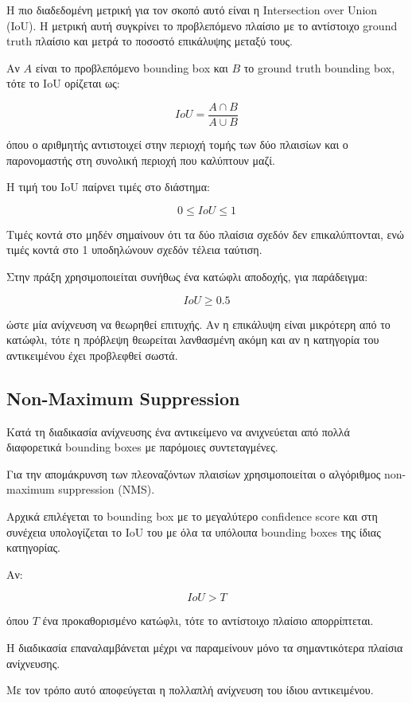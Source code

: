 \documentclass[12pt]{article}
\begin{document}
Η πιο διαδεδομένη μετρική για τον σκοπό αυτό είναι η Intersection over Union (IoU). Η μετρική αυτή συγκρίνει το προβλεπόμενο πλαίσιο με το αντίστοιχο 
ground truth πλαίσιο και μετρά το ποσοστό επικάλυψης μεταξύ τους.

Αν $A$ είναι το προβλεπόμενο bounding box και $B$ το ground truth bounding box, τότε το IoU ορίζεται ως:

\[
IoU=
\frac{A \cap B}
{A \cup B}
\]

όπου ο αριθμητής αντιστοιχεί στην περιοχή τομής των δύο πλαισίων και ο παρονομαστής στη συνολική περιοχή που καλύπτουν μαζί.

Η τιμή του IoU παίρνει τιμές στο διάστημα:

\[
0 \le IoU \le 1
\]

Τιμές κοντά στο μηδέν σημαίνουν ότι τα δύο πλαίσια σχεδόν δεν επικαλύπτονται, ενώ τιμές κοντά στο 1 υποδηλώνουν σχεδόν τέλεια ταύτιση.

Στην πράξη χρησιμοποιείται συνήθως ένα κατώφλι αποδοχής, για παράδειγμα:

\[
IoU \ge 0.5
\]

ώστε μία ανίχνευση να θεωρηθεί επιτυχής. Αν η επικάλυψη είναι μικρότερη από το κατώφλι, τότε η πρόβλεψη θεωρείται λανθασμένη ακόμη και αν η κατηγορία 
του αντικειμένου έχει προβλεφθεί σωστά.

\subsection{Non-Maximum Suppression}

Κατά τη διαδικασία ανίχνευσης ένα αντικείμενο να
ανιχνεύεται από πολλά διαφορετικά bounding boxes με παρόμοιες
συντεταγμένες.

Για την απομάκρυνση των πλεοναζόντων πλαισίων χρησιμοποιείται ο
αλγόριθμος non-maximum suppression (NMS).

Αρχικά επιλέγεται το bounding box με το μεγαλύτερο confidence score και
στη συνέχεια υπολογίζεται το IoU του με όλα τα υπόλοιπα bounding boxes
της ίδιας κατηγορίας.

Αν:

\[
IoU > T
\]

όπου \(T\) ένα προκαθορισμένο κατώφλι, τότε το αντίστοιχο πλαίσιο
απορρίπτεται.

Η διαδικασία επαναλαμβάνεται μέχρι να παραμείνουν μόνο τα
σημαντικότερα πλαίσια ανίχνευσης.

Με τον τρόπο αυτό αποφεύγεται η πολλαπλή ανίχνευση του ίδιου
αντικειμένου.
\end{document}
